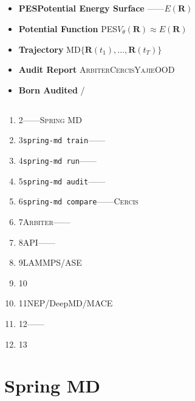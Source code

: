 \documentclass[12pt,a4paper]{article}
\theoremstyle{remark}
\newcommand{\Yajie}{\textsc{Yajie}}
\newcommand{\Cercis}{\textsc{Cercis}}
\newcommand{\Arbiter}{\textsc{Arbiter}}
\newcommand{\SpringMD}{\textsc{Spring MD}}
\begin{document}
\subsection{}

\begin{itemize}[nosep]
    \item \textbf{PESPotential Energy Surface} ——$E(\mathbf{R})$
    \item \textbf{Potential Function} PES$V_\theta(\mathbf{R}) \approx E(\mathbf{R})$
    \item \textbf{Trajectory} MD$\{\mathbf{R}(t_1), \ldots, \mathbf{R}(t_T)\}$
    \item \textbf{Audit Report} \Arbiter{}\Cercis{}\Yajie{}OOD
    \item \textbf{Born Audited} /
\end{itemize}

\subsection{}

\begin{enumerate}[label=(\arabic*),itemsep=3pt]
    \item 2——\SpringMD{}
    \item 3\texttt{spring-md train}——
    \item 4\texttt{spring-md run}——
    \item 5\texttt{spring-md audit}——
    \item 6\texttt{spring-md compare}——\Cercis{}
    \item 7\Arbiter{}——
    \item 8API——
    \item 9LAMMPS/ASE
    \item 10
    \item 11NEP/DeepMD/MACE
    \item 12——
    \item 13
\end{enumerate}

\newpage

\section{Spring MD}

\subsection{}
\end{document}
